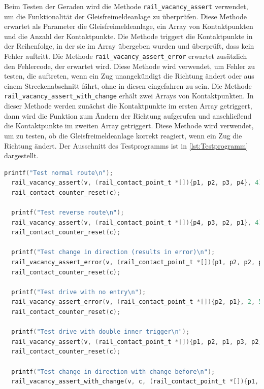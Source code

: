 Beim Testen der Geraden wird die Methode \texttt{rail\_vacancy\_assert} verwendet, um die Funktionalität der Gleisfreimeldeanlage zu überprüfen. Diese Methode erwartet als Parameter die Gleisfreimeldeanlage, ein Array von Kontaktpunkten und die Anzahl der Kontaktpunkte. Die Methode triggert die Kontaktpunkte in der Reihenfolge, in der sie im Array übergeben wurden und überprüft, dass kein Fehler auftritt.\newline 
Die Methode \texttt{rail\_vacancy\_assert\_error} erwartet zusätzlich den Fehlercode, der erwartet wird. Diese Methode wird verwendet, um Fehler zu testen, die auftreten, wenn ein Zug unangekündigt die Richtung ändert oder aus einem Streckenabschnitt fährt, ohne in diesen eingefahren zu sein.\newline 
Die Methode \texttt{rail\_vacancy\_assert\_with\_change} erhält zwei Arrays von Kontaktpunkten. In dieser Methode werden zunächst die Kontaktpunkte im ersten Array getriggert, dann wird die Funktion zum Ändern der Richtung aufgerufen und anschließend die Kontaktpunkte im zweiten Array getriggert. Diese Methode wird verwendet, um zu testen, ob die Gleisfreimeldeanlage korrekt reagiert, wenn ein Zug die Richtung ändert. Der Ausschnitt des Testprogramms ist in \autoref{lst:Testprogramm} dargestellt.

\begin{lstlisting}[caption={Ausschnitt des Testprogramms für Geraden},label={lst:Testprogramm},language=C]
  printf("Test normal route\n");
  rail_vacancy_assert(v, (rail_contact_point_t *[]){p1, p2, p3, p4}, 4);
  rail_contact_counter_reset(c);

  printf("Test reverse route\n");
  rail_vacancy_assert(v, (rail_contact_point_t *[]){p4, p3, p2, p1}, 4);
  rail_contact_counter_reset(c);

  printf("Test change in direction (results in error)\n");
  rail_vacancy_assert_error(v, (rail_contact_point_t *[]){p1, p2, p2, p1}, 4, 4);
  rail_contact_counter_reset(c);

  printf("Test drive with no entry\n");
  rail_vacancy_assert_error(v, (rail_contact_point_t *[]){p2, p1}, 2, 5);
  rail_contact_counter_reset(c);

  printf("Test drive with double inner trigger\n");
  rail_vacancy_assert(v, (rail_contact_point_t *[]){p1, p2, p1, p3, p2, p4, p3, p4}, 8);
  rail_contact_counter_reset(c);

  printf("Test change in direction with change before\n");
  rail_vacancy_assert_with_change(v, c, (rail_contact_point_t *[]){p1, p2, p1, p2}, 4, (rail_contact_point_t *[]){p2, p1, p2, p1}, 4);
\end{lstlisting}

